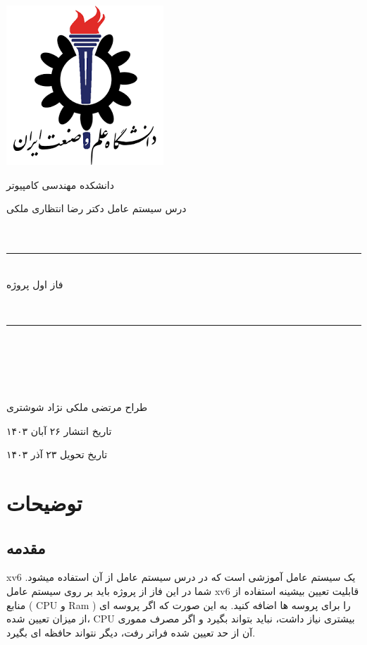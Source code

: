 \documentclass{article}
\begin{document}
		\linespread{3}
		
		\begin{center}
			\includegraphics{logo.png}  
			
			\Large{دانشکده مهندسی کامپیوتر}
			
			\Large{درس سیستم عامل}
			\Large{
			دکتر رضا انتظاری ملکی
			}
			\\
			~\\
			~\\
			\hrule 
			~\\
                                 فاز اول پروژه
                                 		\end{center}
			~\\
			
			\hrule 
			~\\
			~\\
			~\\
			~\\	


			\begin{center}



			
			طراح
			\dotfill 
			مرتضی ملکی نژاد شوشتری


			
			تاریخ انتشار 
			\dotfill 
			۲۶ آبان ۱۴۰۳

			
			تاریخ تحویل
			\dotfill
			۲۳ آذر ۱۴۰۳
						\end{center}
			
			\newpage

		\section{توضیحات}
		\subsection{مقدمه}
		xv6
		یک سیستم عامل آموزشی است  که در درس سیستم عامل از آن استفاده میشود.
		شما در این فاز از پروژه باید بر روی سیستم عامل xv6 قابلیت تعیین بیشینه استفاده از منابع  ( CPU و Ram ) را برای پروسه ها اضافه کنید. به این صورت که اگر پروسه ای از میزان تعیین شده، CPU بیشتری نیاز داشت، نباید بتواند بگیرد و اگر مصرف مموری آن از حد تعیین شده فراتر رفت، دیگر نتواند حافظه ای بگیرد.
		
\end{document}
